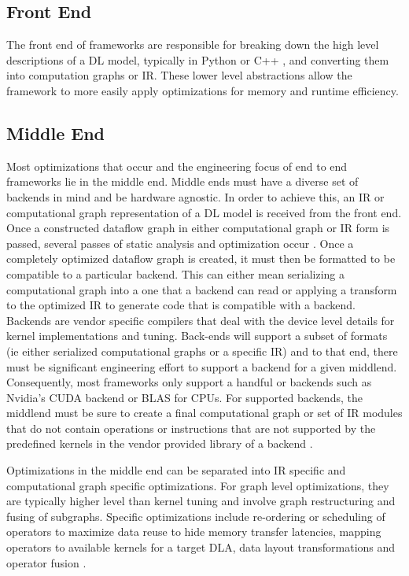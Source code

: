 
\subsection{Front End}
The front end of frameworks are responsible for breaking down the high level
descriptions of a DL model, typically in Python or C++ \cite{tensorflow}, and
converting them into computation graphs or IR. These lower level abstractions
allow the framework to more easily apply optimizations for memory and runtime
efficiency.

\subsection{Middle End}
Most optimizations that occur and the engineering focus of end to end
frameworks lie in the middle end. Middle ends must have a diverse set of
backends in mind and be hardware agnostic. In order to achieve this, an IR or
computational graph representation of a DL model is received from the front
end. Once a constructed dataflow graph in either computational graph or IR
form is passed, several passes of static analysis and optimization occur
\cite{TVM} \cite{DLVM} \cite{tensorflow}. Once a completely optimized dataflow
graph is created, it must then be formatted to be compatible to a particular
backend. This can either mean serializing a computational graph into a one
that a backend can read or applying a transform to the optimized IR to generate
code that is compatible with a backend. Backends are vendor specific compilers
that deal with the device level details for kernel implementations and tuning.
Back-ends will support a subset of formats (ie either serialized computational
graphs or a specific IR) and to that end, there must be significant engineering
effort to support a backend for a given middlend. Consequently, most frameworks
only support a handful or backends such as Nvidia's CUDA backend or BLAS for
CPUs. For supported backends, the middlend must be sure to create a final
computational graph or set of IR modules that do not contain operations or
instructions that are not supported by the predefined kernels in the vendor
provided library of a backend \cite{TVM}.

Optimizations in the middle end can be separated into IR specific and
computational graph specific optimizations. For graph level optimizations,
they are typically higher level than kernel tuning and involve graph
restructuring and fusing of subgraphs. Specific optimizations include
re-ordering or scheduling of operators to maximize data reuse
to hide memory transfer latencies, mapping operators to available kernels
for a target DLA, data layout transformations and operator fusion \cite{TVM}.

